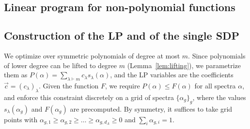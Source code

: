 \documentclass[aps,pra,twocolumn,showpacs,superscriptaddress,groupedaddress]{revtex4-2}
\renewcommand{\a}{\alpha}
\begin{document}
\begin{widetext}
\section{Linear program for non-polynomial functions}\label{app:LP}

\subsection{Construction of the LP and of the single SDP}
We optimize over symmetric polynomials of degree at most $m$. Since polynomials of lower degree can be lifted to degree $m$ (Lemma~\ref{lem:lifting}), we parametrize them as $P(\a)=\sum_{\lambda\vdash m}c_\lambda s_\lambda(\a)$, and the LP variables are the coefficients $\vec c=(c_\lambda)_\lambda$. Given the function $F$, we require $P(\a)\leq F(\a)$ for all spectra $\a$, and enforce this constraint discretely on a grid of spectra $\{\a_g\}_g$, where the values $s_\lambda(\a_g)$ and $F(\a_g)$ are precomputed. By symmetry, it suffices to take grid points with $\a_{g,1}\geq\a_{g,2}\geq\dots\geq\a_{g,d_A}\geq0$ and $\sum_i\a_{g,i}=1$.


\end{widetext}
\end{document}
